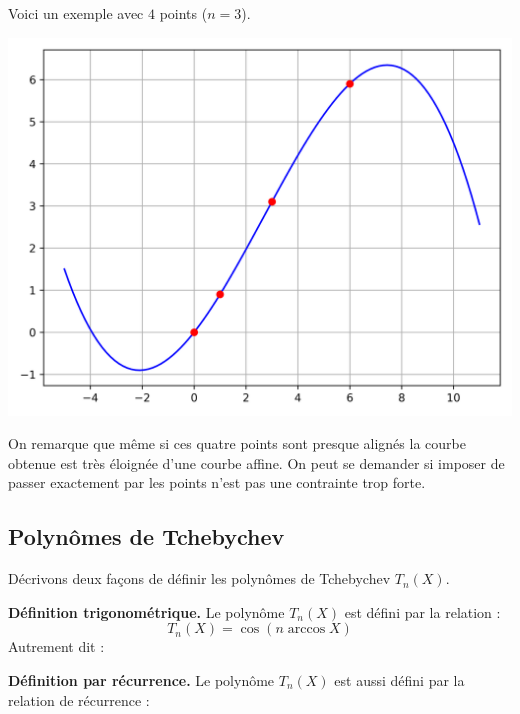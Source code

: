 \documentclass[11pt,class=report,crop=false]{standalone}
\begin{document}
\begin{exemple}
Voici un exemple avec $4$ points ($n=3$).

\begin{center}
  \includegraphics[scale=\myscale,scale=0.5]{figures/approx-lagrange-03}
\end{center}

On remarque que même si ces quatre points sont presque alignés la courbe obtenue est très éloignée d'une courbe affine. 
On peut se demander si imposer de passer exactement par les points n'est pas une contrainte trop forte.
\end{exemple}


\subsection{Polynômes de Tchebychev}


Décrivons deux façons de définir les polynômes de Tchebychev $T_n(X)$.

\textbf{Définition trigonométrique.}
Le polynôme $T_n(X)$ est défini par la relation :
$$T_n(X) = \cos(n \arccos X)$$
Autrement dit :



\textbf{Définition par récurrence.}
Le polynôme $T_n(X)$ est aussi défini par la relation de récurrence :
\end{document}
